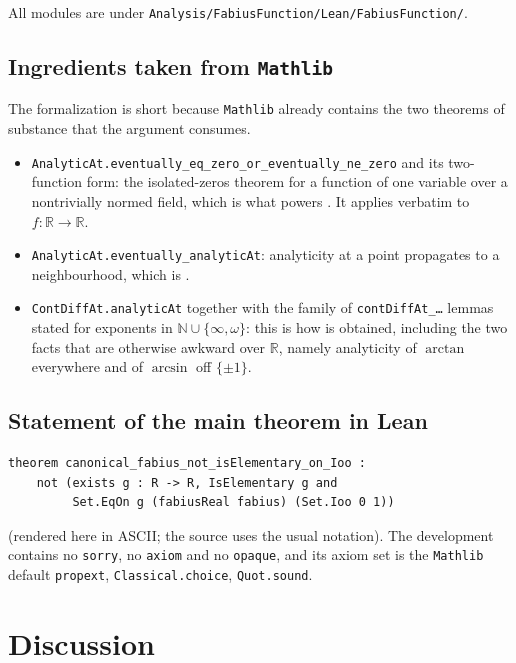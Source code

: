 \documentclass[11pt,oneside]{article}
\theoremstyle{definition}
\theoremstyle{remark}
\newcommand{\R}{\mathbb R}
\newcommand{\N}{\mathbb N}
\newcommand{\repo}{\nolinkurl{Analysis/FabiusFunction}}
\begin{document}
All modules are under \texttt{\repo/Lean/FabiusFunction/}.

\subsection{Ingredients taken from \texttt{Mathlib}}

The formalization is short because \texttt{Mathlib} already contains the two
theorems of substance that the argument consumes.

\begin{itemize}
\item \texttt{AnalyticAt.eventually\_eq\_zero\_or\_eventually\_ne\_zero} and
      its two-function form: the isolated-zeros theorem for a function of one
      variable over a nontrivially normed field, which is what powers
      .  It applies verbatim to $f\colon\R\to\R$.
\item \texttt{AnalyticAt.eventually\_analyticAt}: analyticity at a point
      propagates to a neighbourhood, which is .
\item \texttt{ContDiffAt.analyticAt} together with the family of
      \texttt{contDiffAt\_\ldots} lemmas stated for exponents in
      $\N\cup\{\infty,\omega\}$: this is how  is
      obtained, including the two facts that are otherwise awkward over $\R$,
      namely analyticity of $\arctan$ everywhere and of $\arcsin$ off
      $\{\pm1\}$.
\end{itemize}

\subsection{Statement of the main theorem in Lean}

\begin{lstlisting}[style=pseudo]
theorem canonical_fabius_not_isElementary_on_Ioo :
    not (exists g : R -> R, IsElementary g and
         Set.EqOn g (fabiusReal fabius) (Set.Ioo 0 1))
\end{lstlisting}

\noindent (rendered here in ASCII; the source uses the usual notation).  The
development contains no \texttt{sorry}, no \texttt{axiom} and no
\texttt{opaque}, and its axiom set is the \texttt{Mathlib} default
\texttt{propext}, \texttt{Classical.choice}, \texttt{Quot.sound}.

\section{Discussion}
\end{document}
